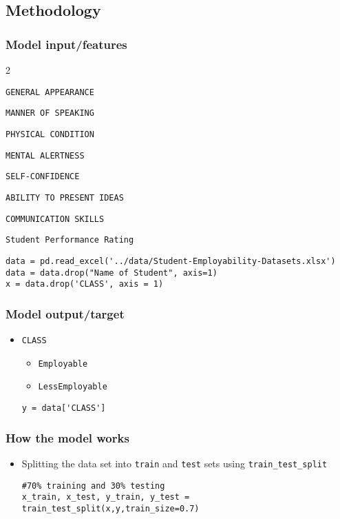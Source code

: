 \subsection{Methodology}
\begin{frame}[fragile]
\frametitle{Model input/features}
	\begin{itemize}
\begin{verbatim}
data = pd.read_excel('../data/Student-Employability-Datasets.xlsx')
data = data.drop("Name of Student", axis=1)
x = data.drop('CLASS', axis = 1)
\end{verbatim}
	\end{itemize}
\end{frame}

\begin{frame}[fragile]
\frametitle{Model output/target}
	\begin{itemize}
		\item \texttt{CLASS}
		\begin{itemize}
			\item \texttt{Employable}
			\item \texttt{LessEmployable}
		\end{itemize}
\begin{verbatim}
y = data['CLASS']
\end{verbatim}
	\end{itemize}
\end{frame}

\begin{frame}[fragile]
\frametitle{How the model works}
	\begin{itemize}
		\item Splitting the data set into \texttt{train} and \texttt{test} sets using \texttt{train\_test\_split}
\begin{verbatim}
#70% training and 30% testing
x_train, x_test, y_train, y_test = train_test_split(x,y,train_size=0.7)
\end{verbatim}
	\end{itemize}
\end{frame}

